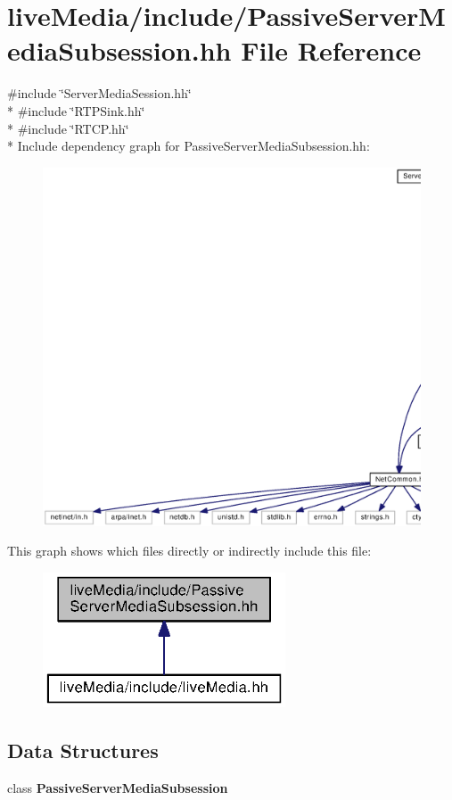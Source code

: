 \section{live\+Media/include/\+Passive\+Server\+Media\+Subsession.hh File Reference}
\label{PassiveServerMediaSubsession_8hh}
{\ttfamily \#include \char`\"{}Server\+Media\+Session.\+hh\char`\"{}}\\*
{\ttfamily \#include \char`\"{}R\+T\+P\+Sink.\+hh\char`\"{}}\\*
{\ttfamily \#include \char`\"{}R\+T\+C\+P.\+hh\char`\"{}}\\*
Include dependency graph for Passive\+Server\+Media\+Subsession.\+hh\+:
\nopagebreak
\begin{figure}[H]
\begin{center}
\leavevmode
\includegraphics[width=350pt]{PassiveServerMediaSubsession_8hh__incl}
\end{center}
\end{figure}
This graph shows which files directly or indirectly include this file\+:
\nopagebreak
\begin{figure}[H]
\begin{center}
\leavevmode
\includegraphics[width=204pt]{PassiveServerMediaSubsession_8hh__dep__incl}
\end{center}
\end{figure}
\subsection*{Data Structures}
\begin{DoxyCompactItemize}
\item 
class {\bf Passive\+Server\+Media\+Subsession}
\end{DoxyCompactItemize}
